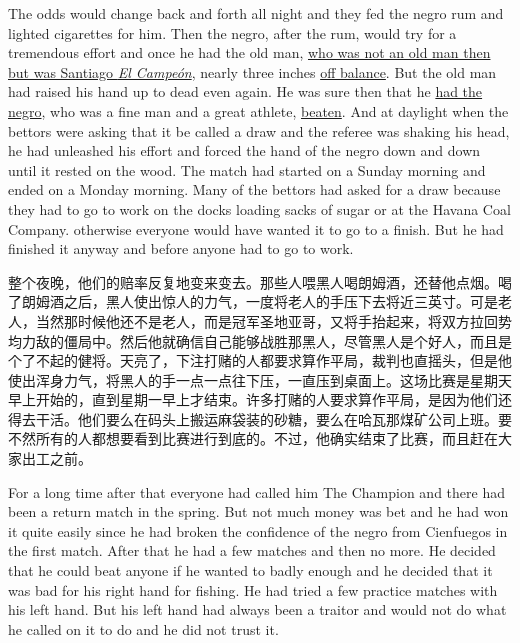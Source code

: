\begin{paracol}{2}
\switchcolumn*

The \gls{odds} would change back and \gls{forth} all night and they fed the
negro \gls{rum} and lighted cigarettes for him. Then the negro, after the
rum, would try for a \gls{tremendous} effort and once he had the old man,
\uline{who was not an old man then but was Santiago \emph{El Campeón}},
nearly three inches \uline{off balance}. But the old man had raised his hand
up to dead even again. He was sure then that he \uline{had the negro}, who
was a fine man and a great \gls{athlete}, \uline{beaten}. And at daylight
when the bettors were asking that it be called a draw and the referee was
shaking his head, he had unleashed his effort and forced the hand of the
negro down and down until it rested on the wood. The match had started on a
Sunday morning and ended on a Monday morning. Many of the bettors had asked
for a draw because they had to go to work on the docks \gls{loading} sacks
of sugar or at the Havana Coal Company. \Gls{otherwise} everyone would have
wanted it to go to a finish. But he had finished it anyway and before anyone
had to go to work.

\switchcolumn

整个夜晚，他们的赔率反复地变来变去。那些人喂黑人喝朗姆酒，还替他点烟。喝了朗姆酒之后，黑人使出惊人的力气，一度将老人的手压下去将近三英寸。可是老人，当然那时候他还不是老人，而是冠军圣地亚哥，又将手抬起来，将双方拉回势均力敌的僵局中。然后他就确信自己能够战胜那黑人，尽管黑人是个好人，而且是个了不起的健将。天亮了，下注打赌的人都要求算作平局，裁判也直摇头，但是他使出浑身力气，将黑人的手一点一点往下压，一直压到桌面上。这场比赛是星期天早上开始的，直到星期一早上才结束。许多打赌的人要求算作平局，是因为他们还得去干活。他们要么在码头上搬运麻袋装的砂糖，要么在哈瓦那煤矿公司上班。要不然所有的人都想要看到比赛进行到底的。不过，他确实结束了比赛，而且赶在大家出工之前。

\switchcolumn*

For a long time after that everyone had called him The Champion and there
had been a return match in the spring. But not much money was bet and he had
won it quite easily since he had broken the confidence of the negro from
Cienfuegos in the first match. After that he had a few matches and then no
more. He decided that he could beat anyone if he wanted to \gls{badly}
enough and he decided that it was bad for his right hand for fishing. He had
tried a few practice matches with his left hand. But his left hand had
always been a \gls{traitor} and would not do what he called on it to do and
he did not trust it.


\end{paracol}
